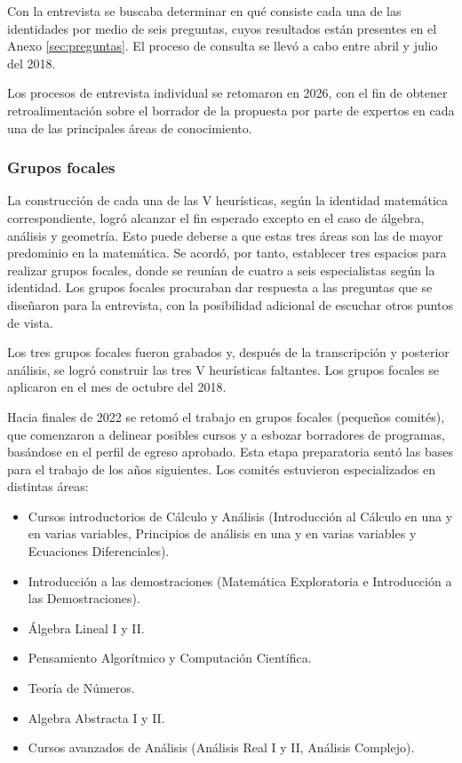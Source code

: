 Con la entrevista se buscaba determinar en qué consiste cada una de las identidades por medio de seis preguntas, cuyos resultados están presentes en el Anexo \ref{sec:preguntas}. El proceso de consulta se llevó a cabo entre abril y julio del 2018.

Los procesos de entrevista individual se retomaron en 2026, con el fin de obtener retroalimentación sobre el borrador de la propuesta por parte de expertos en cada una de las principales áreas de conocimiento.

\subsubsection{Grupos focales}

La construcción de cada una de las V heurísticas, según la identidad matemática correspondiente, logró alcanzar el fin esperado excepto en el caso de álgebra, análisis y geometría. Esto puede deberse a que estas tres áreas son las de mayor predominio en la matemática. Se acordó, por tanto, establecer tres espacios para realizar grupos focales, donde se reunían de cuatro a seis especialistas según la identidad. Los grupos focales procuraban dar respuesta a las preguntas que se diseñaron para la entrevista, con la posibilidad adicional de escuchar otros puntos de vista.

Los tres grupos focales fueron grabados y, después de la transcripción y posterior análisis, se logró construir las tres V heurísticas faltantes. Los grupos focales se aplicaron en el mes de octubre del 2018. 

Hacia finales de 2022 se retomó el trabajo en grupos focales (pequeños comités), que comenzaron a delinear posibles cursos y a esbozar borradores de programas, basándose en el perfil de egreso aprobado. Esta etapa preparatoria sentó las bases para el trabajo de los años siguientes. Los comités estuvieron especializados en distintas áreas:  
\begin{itemize}
  \item Cursos introductorios de Cálculo y Análisis (Introducción al Cálculo en una y en varias variables, Principios de análisis en una y en varias variables y Ecuaciones Diferenciales).  
  \item Introducción a las demostraciones (Matemática Exploratoria e Introducción a las Demostraciones).  
  \item Álgebra Lineal I y II.  
  \item Pensamiento Algorítmico y Computación Científica.  
  \item Teoría de Números. 
  \item Algebra Abstracta I y II.
  \item Cursos avanzados de Análisis (Análisis Real I y II, Análisis Complejo).  
\end{itemize}

